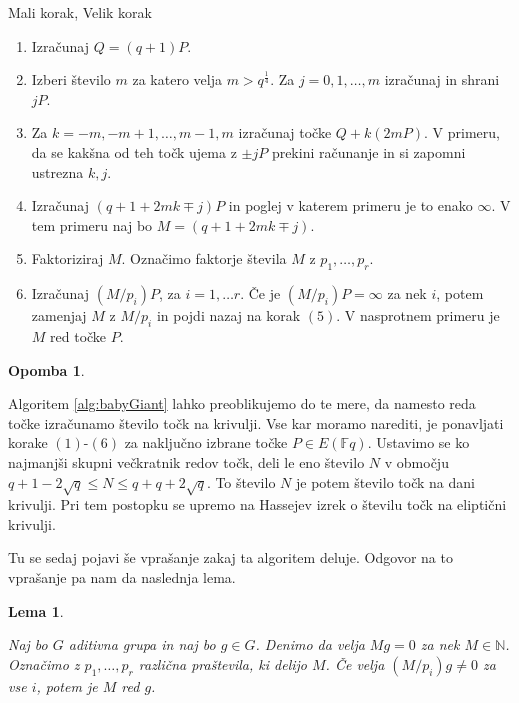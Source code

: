 \documentclass[12pt,a4paper,twoside]{article}
\theoremstyle{definition} %
\newtheorem{opomba}[definicija]{Opomba}
\theoremstyle{plain} %
\newtheorem{lema}[definicija]{Lema}
\numberwithin{equation}{section}  %
\newcommand{\N}{\mathbb N}
\newcommand{\F}{\mathbb F}
\begin{document}
\begin{algorithm}[H]
\caption[MV]{Mali korak, Velik korak}
\label{alg:babyGiant}
\begin{enumerate}
\item Izračunaj $Q = (q+1)P$.
\item Izberi število $m$ za katero velja $m >q^{\frac{1}{4}}$. Za $j = 0,1,\ldots,m$ izračunaj in shrani $jP$.
\item Za $k = -m,-m+1,\ldots,m-1,m$ izračunaj točke $Q +k(2mP)$. V primeru, da se kakšna od teh točk ujema z $\pm jP$ prekini računanje in si zapomni ustrezna $k,j$.
\item Izračunaj $(q+1+2mk \mp j)P$ in poglej v katerem primeru je to enako $\infty$. V tem primeru naj bo $M = (q+1+2mk \mp j)$.
\item Faktoriziraj $M$. Označimo faktorje števila $M$ z $p_1,\ldots,p_r$.
\item Izračunaj $(M/p_i)P$, za $i=1,\ldots r$. Če je $(M/p_i)P = \infty$ za nek $i$, potem zamenjaj $M$ z $M/p_i$ in pojdi nazaj na korak $(5)$. V nasprotnem primeru je $M$ red točke $P$.
\end{enumerate}

\end{algorithm}

\begin{opomba}~

\label{opo:MaliVeliki}
Algoritem \ref{alg:babyGiant} lahko preoblikujemo do te mere, da namesto reda točke izračunamo število točk na krivulji. Vse kar moramo narediti, je ponavljati korake $(1)$-$(6)$ za naključno izbrane točke $P \in E(\F{q})$. Ustavimo se ko najmanjši skupni večkratnik redov točk, deli le eno število $N$ v območju $q+1-2\sqrt{q} \leq N \leq q+q+2\sqrt{q}$. To število $N$ je potem število točk na dani krivulji. Pri tem postopku se upremo na Hassejev izrek o številu točk na eliptični krivulji.

\end{opomba}

Tu se sedaj pojavi še vprašanje zakaj ta algoritem deluje. Odgovor na to vprašanje pa nam da naslednja lema.

\begin{lema}~

Naj bo $G$ aditivna grupa in naj bo $g\in G$. Denimo da velja $Mg = 0$ za nek $M \in \N$. Označimo z $p_1,\ldots,p_r$ različna praštevila, ki delijo $M$. Če velja $(M/p_i)g \neq  0$ za vse $i$, potem je $M$ red $g$.

\end{lema}
\end{document}
